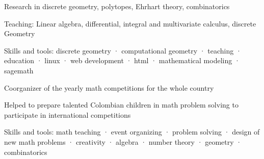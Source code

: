 \documentclass[]{plushcv}
\begin{document}
\begin{minipage}[t]{0.70\textwidth}

\sectionsep
{}
\begin{tightemize}
  \sectionsep
\item Research in discrete geometry, polytopes, Ehrhart theory, combinatorics
\item Teaching: Linear algebra, differential, integral and multivariate calculus, discrete Geometry
\item Skills and tools: discrete geometry · computational geometry · teaching · education  · linux · web development  · html · mathematical modeling · sagemath%
\end{tightemize}
\sectionsep

\begin{tightemize}
  \sectionsep
\item Coorganizer of the yearly math competitions for the whole country
\item Helped to prepare talented Colombian children in math problem solving to participate in international competitions
  
\item Skills and tools: math teaching  · event organizing  · problem solving  · design of new math problems · creativity · algebra  · number theory  · geometry  · combinatorics
\end{tightemize}







\end{minipage}
\end{document}

